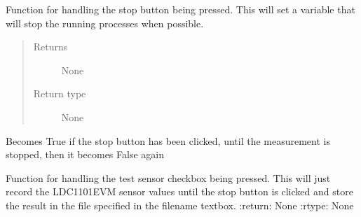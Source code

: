 \documentclass[letterpaper,10pt,english]{sphinxmanual}
\begin{document}
\begin{fulllineitems}
\begin{fulllineitems}
\end{fulllineitems}


\begin{fulllineitems}
\label{\detokenize{index:app.MainWindow.stop}}
\sphinxAtStartPar
Function for handling the stop button being pressed. This will set a variable that will stop the running processes when possible.
\begin{quote}\begin{description}
\item[{Returns}] \leavevmode
\sphinxAtStartPar
None

\item[{Return type}] \leavevmode
\sphinxAtStartPar
None

\end{description}\end{quote}

\end{fulllineitems}


\begin{fulllineitems}
\label{\detokenize{index:app.MainWindow.stop_button_clicked}}
\sphinxAtStartPar
Becomes True if the stop button has been clicked, until the measurement is stopped, then it becomes False again

\end{fulllineitems}


\begin{fulllineitems}
\label{\detokenize{index:app.MainWindow.test_sensor}}
\sphinxAtStartPar
Function for handling the test sensor checkbox being pressed. This will just record the LDC1101EVM sensor values until the stop button is clicked and store the result in the file specified in the filename textbox.
:return: None
:rtype: None

\end{fulllineitems}


\end{fulllineitems}
\end{document}
